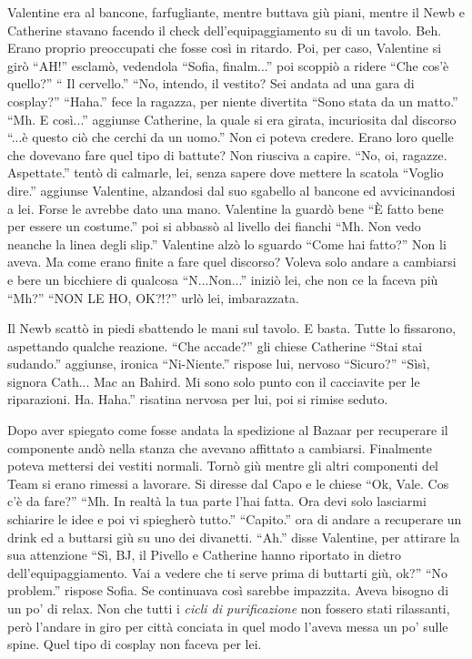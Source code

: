     Valentine era al bancone, farfugliante, mentre buttava giù piani, mentre il Newb e Catherine stavano facendo il
    check dell'equipaggiamento su di un tavolo. Beh. Erano proprio preoccupati che fosse così in ritardo. Poi, per caso,
    Valentine si girò ``AH!'' esclamò, vedendola ``Sofia, finalm...'' poi scoppiò a ridere ``Che cos'è quello?'' `` Il
    cervello.'' ``No, intendo, il vestito? Sei andata ad una gara di cosplay?'' ``Haha.'' fece la ragazza, per niente
    divertita ``Sono stata da un matto.'' ``Mh. E così...'' aggiunse Catherine, la quale si era girata, incuriosita dal
    discorso ``...è questo ciò che cerchi da un uomo.'' Non ci poteva credere. Erano loro quelle che dovevano fare quel
    tipo di battute? Non riusciva a capire. ``No, oi, ragazze. Aspettate.'' tentò di calmarle, lei, senza sapere dove
    mettere la scatola ``Voglio dire.'' aggiunse Valentine, alzandosi dal suo sgabello al bancone ed avvicinandosi a
    lei. Forse le avrebbe dato una mano. Valentine la guardò bene ``È fatto bene per essere un costume.'' poi si abbassò
    al livello dei fianchi ``Mh. Non vedo neanche la linea degli slip.'' Valentine alzò lo sguardo ``Come hai fatto?''
    Non li aveva. Ma come erano finite a fare quel discorso? Voleva solo andare a cambiarsi e bere un bicchiere di
    qualcosa ``N...Non...'' iniziò lei, che non ce la faceva più ``Mh?'' ``NON LE HO, OK?!?'' urlò lei, imbarazzata.

    Il Newb scattò in piedi sbattendo le mani sul tavolo. E basta. Tutte lo fissarono, aspettando qualche reazione.
    ``Che accade?'' gli chiese Catherine ``Stai stai sudando.'' aggiunse, ironica ``Ni-Niente.'' rispose lui, nervoso
    ``Sicuro?'' ``Sìsì, signora Cath... Mac an Bahird. Mi sono solo punto con il cacciavite per le riparazioni. Ha.
    Haha.'' risatina nervosa per lui, poi si rimise seduto.

    Dopo aver spiegato come fosse andata la spedizione al Bazaar per recuperare il componente andò nella stanza che
    avevano affittato a cambiarsi. Finalmente poteva mettersi dei vestiti normali. Tornò giù mentre gli altri componenti
    del Team si erano rimessi a lavorare. Si diresse dal Capo e le chiese ``Ok, Vale. Cos c'è da fare?'' ``Mh. In realtà
    la tua parte l'hai fatta. Ora devi solo lasciarmi schiarire le idee e poi vi spiegherò tutto.'' ``Capito.'' ora di
    andare a recuperare un drink ed a buttarsi giù su uno dei divanetti. ``Ah.'' disse Valentine, per attirare la sua
    attenzione ``Sì, BJ, il Pivello e Catherine hanno riportato in dietro dell'equipaggiamento. Vai a vedere che ti
    serve prima di buttarti giù, ok?'' ``No problem.''  rispose Sofia. Se continuava così sarebbe impazzita. Aveva
    bisogno di un po' di relax. Non che tutti i \emph{cicli di purificazione} non fossero stati rilassanti, però
    l'andare in giro per città conciata in quel modo l'aveva messa un po' sulle spine. Quel tipo di cosplay non faceva
    per lei.

